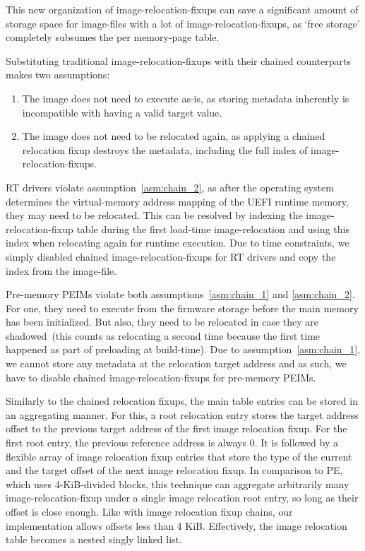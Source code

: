 This new organization of \glspl{image-relocation-fixup} can save a significant amount of storage space for \glspl{image-file} with a lot of \glspl{image-relocation-fixup}, as `free storage' completely subsumes the per \gls{memory-page} table.


Substituting traditional \glspl{image-relocation-fixup} with their chained counterparts makes two assumptions:
\begin{enumerate}
  \item The \gls{image} does not need to execute as-is, as storing metadata inherently is incompatible with having a valid target value.\label{asm:chain_1}
  \item The \gls{image} does not need to be relocated again, as applying a chained relocation fixup destroys the metadata, including the full index of \glspl{image-relocation-fixup}.\label{asm:chain_2}
\end{enumerate}
\gls{RT} drivers violate assumption~\ref{asm:chain_2}, as after the operating system determines the \gls{virtual-memory} address mapping of the \gls{UEFI} runtime memory, they may need to be relocated. This can be resolved by indexing the \gls{image-relocation-fixup} table during the first load-time \gls{image-relocation} and using this index when relocating again for runtime execution. Due to time constraints, we simply disabled chained \glspl{image-relocation-fixup} for \gls{RT} drivers and copy the index from the \gls{image-file}.

Pre-memory \glspl{PEIM} violate both assumptions~\ref{asm:chain_1} and \ref{asm:chain_2}. For one, they need to execute from the \gls{firmware} storage before the main memory has been initialized. But also, they need to be relocated in case they are shadowed~(this counts as relocating a second time because the first time happened as part of preloading at build-time). Due to assumption~\ref{asm:chain_1}, we cannot store any metadata at the relocation target address and as such, we have to disable chained \glspl{image-relocation-fixup} for pre-memory \glspl{PEIM}.




Similarly to the chained relocation fixups, the main table entries can be stored in an aggregating manner. For this, a root relocation entry stores the target address offset to the previous target address of the first image relocation fixup. For the first root entry, the previous reference address is always $0$. It is followed by a flexible array of image relocation fixup entries that store the type of the current and the target offset of the next image relocation fixup. In comparison to PE, which uses 4-KiB-divided blocks, this technique can aggregate arbitrarily many \gls{image-relocation-fixup} under a single image relocation root entry, so long as their offset is close enough. Like with image relocation fixup chains, our implementation allows offsets less than 4 KiB. Effectively, the image relocation table becomes a nested singly linked list.

